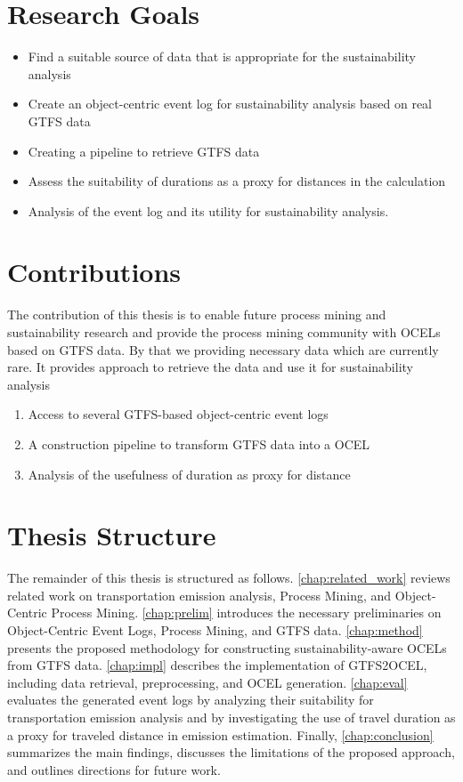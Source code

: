 \section{Research Goals}

\begin{itemize}
    \item Find a suitable source of data that is appropriate for the sustainability analysis 
	\item Create an object-centric event log for sustainability analysis based on real GTFS data
	\item Creating a pipeline to retrieve GTFS data
	\item Assess the suitability of durations as a proxy for distances in the calculation
	\item Analysis of the event log and its utility for sustainability analysis.
    
\end{itemize}

\section{Contributions}
The contribution of this thesis is to enable future process mining and sustainability research and provide the process mining community with OCELs based on GTFS data. By that we providing necessary data which are currently rare. It provides approach to retrieve the data and use it for sustainability analysis
\begin{enumerate}
    \item Access to several GTFS-based object-centric event logs
    \item A construction pipeline to transform GTFS data into a OCEL
    \item Analysis of the usefulness of duration as proxy for distance
\end{enumerate}


\section{Thesis Structure}

The remainder of this thesis is structured as follows. \autoref{chap:related_work} reviews related work on transportation emission analysis, Process Mining, and Object-Centric Process Mining. \autoref{chap:prelim} introduces the necessary preliminaries on Object-Centric Event Logs, Process Mining, and GTFS data. \autoref{chap:method} presents the proposed methodology for constructing sustainability-aware OCELs from GTFS data. \autoref{chap:impl} describes the implementation of GTFS2OCEL, including data retrieval, preprocessing, and OCEL generation. \autoref{chap:eval} evaluates the generated event logs by analyzing their suitability for transportation emission analysis and by investigating the use of travel duration as a proxy for traveled distance in emission estimation. Finally, \autoref{chap:conclusion} summarizes the main findings, discusses the limitations of the proposed approach, and outlines directions for future work.